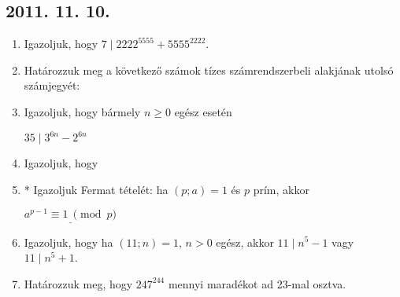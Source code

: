 	\subsection*{2011. 11. 10.}
	\begin{enumerate}
		\item Igazoljuk, hogy $7\mid 2222^{5555}+5555^{2222}$.
		\item Határozzuk meg a következő számok tízes számrendszerbeli alakjának utolsó számjegyét:
		\item Igazoljuk, hogy bármely $n\ge0$ egész esetén
		
		$35\mid 3^{6n}-2^{6n}$
		\item Igazoljuk, hogy
		\item * Igazoljuk Fermat tételét: ha $(p;a)=1$ és $p$ prím, akkor
		\begin{center}
			{$\underline{a^{p-1}\equiv1\ \pmod{p}}$}
		\end{center}
		\item Igazoljuk, hogy ha $(11;n)=1$, $n>0$ egész, akkor $11\mid  n^5-1$ vagy $11\mid  n^5+1$.
		\item Határozzuk meg, hogy $247^{244}$ mennyi maradékot ad 23-mal osztva.
	\end{enumerate}
	
	
